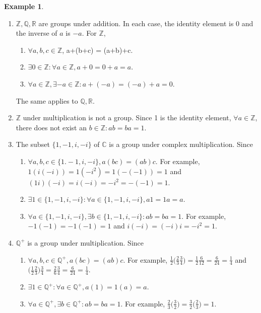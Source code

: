 \documentclass{article}
\theoremstyle{definition}
\newtheorem{example}{Example}[section]
\begin{document}
\begin{example}
\begin{enumerate}
    \item $\mathbb{Z},\mathbb{Q},\mathbb{R}$ are groups under addition. In each case, the identity element is 0 and the inverse of $a$ is $-a$. For $\mathbb{Z}$,
    \begin{enumerate}[label=(\roman*)]
        \item $\forall a,b,c \in \mathbb{Z}$, a+(b+c) = (a+b)+c.
        \item $\exists 0 \in \mathbb{Z}: \forall a \in \mathbb{Z}, a+0=0+a=a$.
        \item $\forall a \in \mathbb{Z}, \exists -a \in \mathbb{Z}: a+(-a)=(-a)+a=0$.
    \end{enumerate}
    The same applies to $\mathbb{Q,R}$.
    
    \item $\mathbb{Z}$ under multiplication is not a group. Since 1 is the identity element, $\forall a \in \mathbb{Z}$, there does not exist an $b \in \mathbb{Z}: ab=ba=1$.
    
    \item The subset $\{1,-1,i,-i\}$ of $\mathbb{C}$ is a group under complex multiplication. Since
    \begin{enumerate}[label=(\roman*)]
        \item $\forall a,b,c \in \{1.-1,i,-i\}, a(bc)=(ab)c$. For example, $1(i(-i)) = 1(-i^2) = 1(-(-1)) = 1$ and $(1i)(-i) = i(-i) = -i^2 = -(-1) = 1$.
        \item $\exists 1 \in \{1,-1,i,-i\}: \forall a \in \{1,-1,i,-i\}, a1=1a=a$.
        \item $\forall a \in \{1,-1,i,-i\}, \exists b \in \{1,-1,i,-i\}: ab = ba = 1$. For example, $-1(-1)=-1(-1) = 1$ and $i(-i) = (-i)i = -i^2 = 1$.
    \end{enumerate}
    
    \item $\mathbb{Q}^+$ is a group under multiplication. Since
        \begin{enumerate}[label=(\roman*)]
            \item $\forall a,b,c \in \mathbb{Q}^+, a(bc)=(ab)c$. For example, $\frac{1}{2}\big(\frac{2}{3}\frac{3}{4}\big) = \frac{1}{2}\frac{6}{12} = \frac{6}{24} = \frac{1}{4}$ and $\big(\frac{1}{2}\frac{2}{3}\big)\frac{3}{4} = \frac{2}{6}\frac{3}{4} = \frac{6}{24} = \frac{1}{4}$.
            \item $\exists 1 \in \mathbb{Q}^+: \forall a \in \mathbb{Q}^+, a(1)=1(a)=a$.
            \item $\forall a \in \mathbb{Q}^+, \exists b \in \mathbb{Q}^+: ab=ba=1$. For example, $\frac{2}{3}\big(\frac{3}{2}\big) = \frac{3}{2} \big(\frac{2}{3}\big)= 1$.
        \end{enumerate}
        

\end{enumerate}
\end{example}
\end{document}
